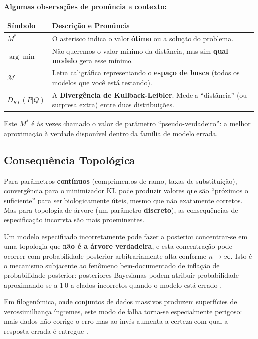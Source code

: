 \vspace{0.5cm}

\textbf{Algumas observações de pronúncia e contexto:}

\begin{center}
\renewcommand{\arraystretch}{1.5}
\begin{tabular}{lp{10cm}}
\hline
\textbf{Símbolo} & \textbf{Descrição e Pronúncia} \\ \hline
$M^*$ & O asterisco indica o valor \textbf{ótimo} ou a solução do problema. \\
$\arg\min$ & Não queremos o valor mínimo da distância, mas sim \textbf{qual modelo} gera esse mínimo. \\
$\mathcal{M}$ & Letra caligráfica representando o \textbf{espaço de busca} (todos os modelos que você está testando). \\
$D_{KL}(P|Q)$ & A \textbf{Divergência de Kullback-Leibler}. Mede a ``distância'' (ou surpresa extra) entre duas distribuições. \\ \hline
\end{tabular}
\end{center}

Este $M^*$ é às vezes chamado o valor de parâmetro ``pseudo-verdadeiro'': a melhor aproximação à verdade disponível dentro da família de modelo errada.

\subsection{Consequência Topológica}

Para parâmetros \textbf{contínuos} (comprimentos de ramo, taxas de substituição), convergência para o minimizador KL pode produzir valores que são ``próximos o suficiente'' para ser biologicamente úteis, mesmo que não exatamente corretos. Mas para topologia de árvore (um parâmetro \textbf{discreto}), as consequências de especificação incorreta são mais proeminentes.

Um modelo especificado incorretamente pode fazer a posterior concentrar-se em uma topologia que \textbf{não é a árvore verdadeira}, e esta concentração pode ocorrer com probabilidade posterior arbitrariamente alta conforme $n \to \infty$. Isto é o mecanismo subjacente ao fenômeno bem-documentado de inflação de probabilidade posterior: posteriores Bayesianas podem atribuir probabilidade aproximando-se a 1.0 a clados incorretos quando o modelo está errado \parencite{suzuki2002,cummings2003,yang2007}.

Em filogenômica, onde conjuntos de dados massivos produzem superfícies de verossimilhança íngremes, este modo de falha torna-se especialmente perigoso: mais dados não corrige o erro mas ao invés aumenta a certeza com qual a resposta errada é entregue \parencite{kumar2012}.

